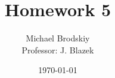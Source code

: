 


\title{Homework 5}
\date{\today}
\author{Michael Brodskiy\\ \small Professor: J. Blazek}



\maketitle

